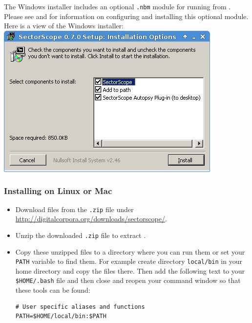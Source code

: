 \documentclass[11pt,fleqn]{article} %
\begin{document}
The Windows installer includes an optional \sscope \aut \verb+.nbm+ module for running \sscope from \aut.  Please see \textbf{} and \textbf{} for information on configuring and installing this optional \sscope module.\\

Here is a view of the \sscope Windows installer:\\
\includegraphics[scale=.4]{screenshots/installer}\\

\subsubsection{Installing on Linux or Mac}
\begin{itemize}
\item Download \sscope files from the \verb+.zip+ file under \url{http://digitalcorpora.org/downloads/sectorscope/}.\\
\item Unzip  the downloaded \verb+.zip+ file to extract \sscope.
\item Copy these unzipped files to a directory where you can run them or set your \verb+PATH+ variable to find them. For example create directory \verb+local/bin+ in your home directory and copy the files there. Then add the following text to your \verb+$HOME/.bash+ file and then close and reopen your command window so that these tools can be found:

\begingroup
\footnotesize
\begin{Verbatim}[fontfamily=courier]
# User specific aliases and functions
PATH=$HOME/local/bin:$PATH
\end{Verbatim}
\endgroup
\end{itemize}
\end{document}
